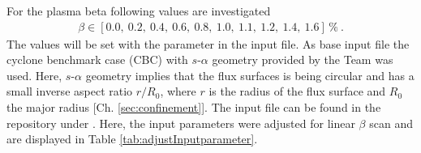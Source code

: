 For the plasma beta following values are investigated
\begin{gather}
    \beta \in [0.0,~0.2,~0.4,~0.6,~0.8,~1.0,~1.1,~1.2,~1.4,~1.6]\,\%~.
\end{gather}
The values will be set with the parameter  in the input file. As base input file the cyclone benchmark case (CBC) with $s$-$\alpha$ geometry provided by the {\gkw} Team was used. Here, $s$-$\alpha$ geometry implies that the flux surfaces is being circular and has a small inverse aspect ratio $r/R_0$, where $r$ is the radius of the flux surface and $R_0$ the major radius [Ch. \ref{sec:confinement}]. The input file can be found in the {\gkw} repository under . Here, the input parameters were adjusted for linear $\beta$ scan and are displayed in Table \ref{tab:adjustInputparameter}. 

\newpage

